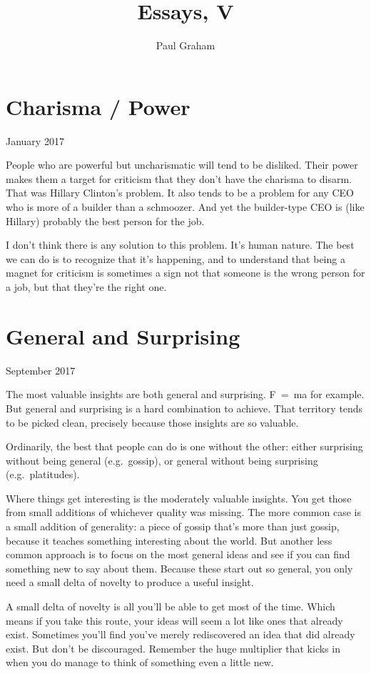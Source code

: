 \documentclass[12pt]{book}
\title{Essays, V}
\author{Paul Graham}
\date{}
\begin{document}
\frontmatter
\maketitle
\tableofcontents
\clearpage
\mainmatter

\chapter{Charisma / Power}

January 2017

People who are powerful but uncharismatic will tend to be disliked.
Their power makes them a target for criticism that they don't have the
charisma to disarm. That was Hillary Clinton's problem. It also tends to
be a problem for any CEO who is more of a builder than a schmoozer. And
yet the builder-type CEO is (like Hillary) probably the best person for
the job.

I don't think there is any solution to this problem. It's human nature.
The best we can do is to recognize that it's happening, and to
understand that being a magnet for criticism is sometimes a sign not
that someone is the wrong person for a job, but that they're the right
one.
\chapter{General and Surprising}

September 2017

The most valuable insights are both general and surprising. F~=~ma for
example. But general and surprising is a hard combination to achieve.
That territory tends to be picked clean, precisely because those
insights are so valuable.

Ordinarily, the best that people can do is one without the other: either
surprising without being general (e.g.~gossip), or general without being
surprising (e.g.~platitudes).

Where things get interesting is the moderately valuable insights. You
get those from small additions of whichever quality was missing. The
more common case is a small addition of generality: a piece of gossip
that's more than just gossip, because it teaches something interesting
about the world. But another less common approach is to focus on the
most general ideas and see if you can find something new to say about
them. Because these start out so general, you only need a small delta of
novelty to produce a useful insight.

A small delta of novelty is all you'll be able to get most of the time.
Which means if you take this route, your ideas will seem a lot like ones
that already exist. Sometimes you'll find you've merely rediscovered an
idea that did already exist. But don't be discouraged. Remember the huge
multiplier that kicks in when you do manage to think of something even a
little new.
\end{document}
